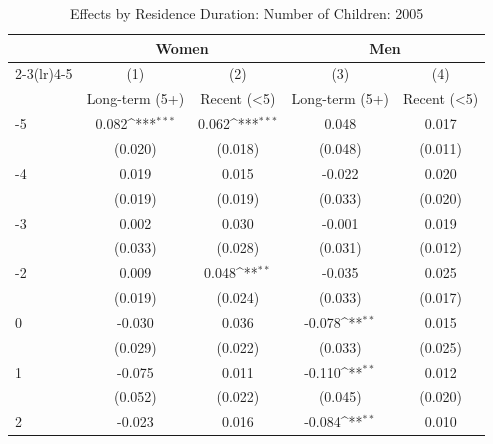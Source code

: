 \begin{table}[htbp]\centering
\def\sym#1{\ifmmode^{#1}\else\(^{#1}\)\fi}
\caption{Effects by Residence Duration: Number of Children:  2005}
\begin{tabular}{l*{4}{c}}
\hline\hline
            &\multicolumn{2}{c}{Women}                  &\multicolumn{2}{c}{Men}                    \\\cmidrule(lr){2-3}\cmidrule(lr){4-5}
            &\multicolumn{1}{c}{(1)}&\multicolumn{1}{c}{(2)}&\multicolumn{1}{c}{(3)}&\multicolumn{1}{c}{(4)}\\
            &\multicolumn{1}{c}{Long-term (5+)}&\multicolumn{1}{c}{Recent (<5)}&\multicolumn{1}{c}{Long-term (5+)}&\multicolumn{1}{c}{Recent (<5)}\\
\hline
-5          &       0.082\sym{***}&       0.062\sym{***}&       0.048         &       0.017         \\
            &     (0.020)         &     (0.018)         &     (0.048)         &     (0.011)         \\
[1em]
-4          &       0.019         &       0.015         &      -0.022         &       0.020         \\
            &     (0.019)         &     (0.019)         &     (0.033)         &     (0.020)         \\
[1em]
-3          &       0.002         &       0.030         &      -0.001         &       0.019         \\
            &     (0.033)         &     (0.028)         &     (0.031)         &     (0.012)         \\
[1em]
-2          &       0.009         &       0.048\sym{**} &      -0.035         &       0.025         \\
            &     (0.019)         &     (0.024)         &     (0.033)         &     (0.017)         \\
[1em]
0           &      -0.030         &       0.036         &      -0.078\sym{**} &       0.015         \\
            &     (0.029)         &     (0.022)         &     (0.033)         &     (0.025)         \\
[1em]
1           &      -0.075         &       0.011         &      -0.110\sym{**} &       0.012         \\
            &     (0.052)         &     (0.022)         &     (0.045)         &     (0.020)         \\
[1em]
2           &      -0.023         &       0.016         &      -0.084\sym{**} &       0.010         \\

\end{tabular}
\end{table}
